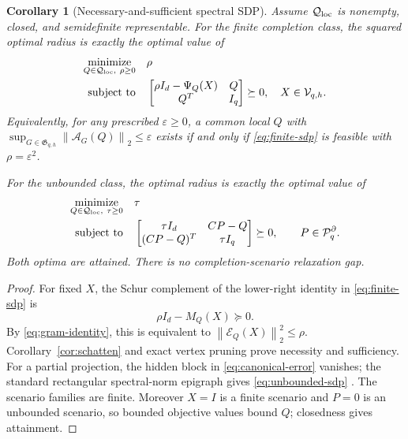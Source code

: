 \documentclass[journal,10pt]{IEEEtran}
\newtheorem{corollary}[theorem]{Corollary}
\theoremstyle{definition}
\theoremstyle{remark}
\newcommand{\cP}{\mathcal P}
\newcommand{\cQ}{\mathcal Q}
\newcommand{\cE}{\mathcal E}
\newcommand{\cA}{\mathcal A}
\newcommand{\fG}{\mathfrak G}
\newcommand{\norm}[1]{\left\lVert #1\right\rVert}
\begin{document}
\begin{corollary}[Necessary-and-sufficient spectral SDP]
\label{cor:sdp}
Assume $\cQ_{\rm loc}$ is nonempty, closed, and semidefinite representable.
For the finite completion class, the squared optimal radius is exactly the
optimal value of
\begin{equation}
\begin{aligned}
 \underset{Q\in\cQ_{\rm loc},\ \rho\geq0}{\operatorname{minimize}}
 &\quad \rho\\
 \text{subject to}
 &\quad
 \begin{bmatrix}
  \rho I_d-\Psi_Q(X) & Q\\
  Q^T&I_q
  \end{bmatrix}\succeq0,
  \quad X\in\mathcal V_{q,h}.
\end{aligned}
\label{eq:finite-sdp}
\end{equation}
Equivalently, for any prescribed $\varepsilon\geq0$, a common local $Q$ with
$\sup_{G\in\fG_{q,h}}\norm{\cA_G(Q)}_2\leq\varepsilon$ exists if and only if
\eqref{eq:finite-sdp} is feasible with $\rho=\varepsilon^2$.

For the unbounded class, the optimal radius is exactly the optimal value of
\begin{equation}
\begin{aligned}
 \underset{Q\in\cQ_{\rm loc},\ \tau\geq0}{\operatorname{minimize}}
 &\quad \tau\\
 \text{subject to}
 &\quad
 \begin{bmatrix}
  \tau I_d&CP-Q\\
  (CP-Q)^T&\tau I_q
 \end{bmatrix}\succeq0,
 \qquad P\in\cP_q^\partial.
\end{aligned}
\label{eq:unbounded-sdp}
\end{equation}
Both optima are attained.  There is no completion-scenario relaxation gap.
\end{corollary}

\begin{proof}
For fixed $X$, the Schur complement of the lower-right identity in
\eqref{eq:finite-sdp} is
\[
  \rho I_d-M_Q(X)\succeq0.
\]
By \eqref{eq:gram-identity}, this is equivalent to
$\norm{\cE_Q(X)}_2^2\leq\rho$.  Corollary~\ref{cor:schatten} and exact vertex
pruning prove necessity and sufficiency.  For a partial projection, the
hidden block in \eqref{eq:canonical-error} vanishes; the standard rectangular
spectral-norm epigraph gives \eqref{eq:unbounded-sdp}
\cite{boyd2004}.  The scenario families
are finite.  Moreover $X=I$ is a finite scenario and $P=0$ is an unbounded
scenario, so bounded objective values bound $Q$; closedness gives attainment.
\end{proof}
\end{document}
